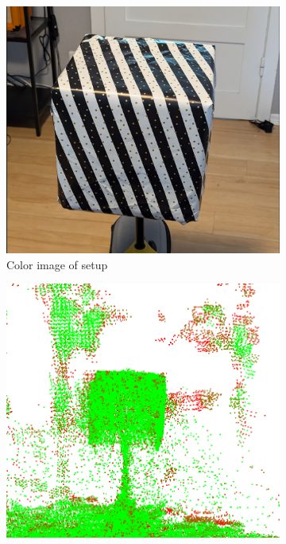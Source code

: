 %
%

\begin{figure}[h!tbp]
    \centering
    \begin{subfigure}[b]{0.33\textwidth}
        \centering
        \includegraphics[width=0.9\linewidth]{images/test-setup}
        \caption{Color image of setup}
    \end{subfigure}%
    \begin{subfigure}[b]{0.33\textwidth}
        \centering
        \includegraphics[width=0.9\linewidth]{images/test-setup-cloud}

\end{subfigure}
\end{figure}
